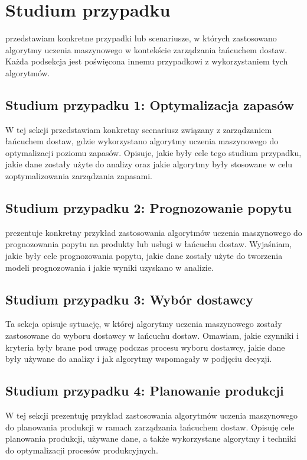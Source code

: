 \newpage %
\section{Studium przypadku}
przedstawiam konkretne przypadki lub scenariusze, w których zastosowano algorytmy uczenia maszynowego w kontekście zarządzania łańcuchem dostaw. Każda podsekcja jest poświęcona innemu przypadkowi z wykorzystaniem tych algorytmów. 

\subsection{Studium przypadku 1: Optymalizacja zapasów}
W tej sekcji przedstawiam konkretny scenariusz związany z zarządzaniem łańcuchem dostaw, gdzie wykorzystano algorytmy uczenia maszynowego do optymalizacji poziomu zapasów. Opisuje, jakie były cele tego studium przypadku, jakie dane zostały użyte do analizy oraz jakie algorytmy były stosowane w celu zoptymalizowania zarządzania zapasami.

\subsection{Studium przypadku 2: Prognozowanie popytu}
prezentuje konkretny przykład zastosowania algorytmów uczenia maszynowego do prognozowania popytu na produkty lub usługi w łańcuchu dostaw. Wyjaśniam, jakie były cele prognozowania popytu, jakie dane zostały użyte do tworzenia modeli prognozowania i jakie wyniki uzyskano w analizie.

\subsection{Studium przypadku 3: Wybór dostawcy}
Ta sekcja opisuje sytuację, w której algorytmy uczenia maszynowego zostały zastosowane do wyboru dostawcy w łańcuchu dostaw. Omawiam, jakie czynniki i kryteria były brane pod uwagę podczas procesu wyboru dostawcy, jakie dane były używane do analizy i jak algorytmy wspomagały w podjęciu decyzji.


\subsection{Studium przypadku 4: Planowanie produkcji}
W tej sekcji prezentuję przykład zastosowania algorytmów uczenia maszynowego do planowania produkcji w ramach zarządzania łańcuchem dostaw. Opisuję cele planowania produkcji, używane dane, a także wykorzystane algorytmy i techniki do optymalizacji procesów produkcyjnych.

